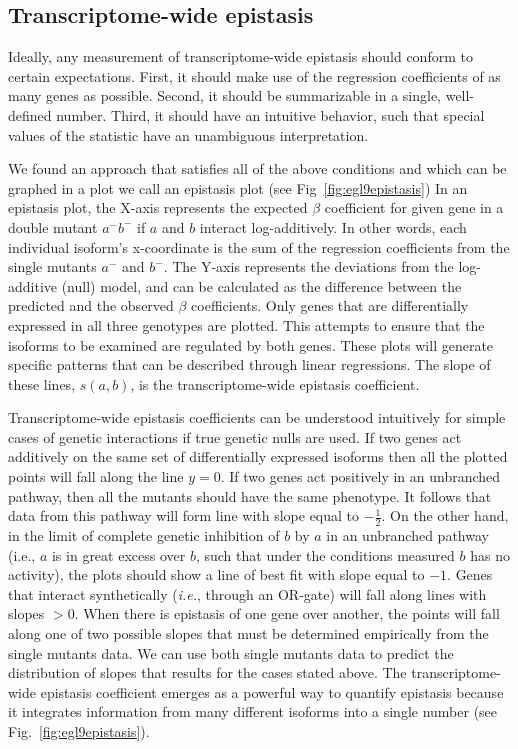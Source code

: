 \documentclass[9pt,twocolumn,twoside]{pnas-new}
\begin{document}
\subsection*{Transcriptome-wide epistasis}
Ideally, any measurement of transcriptome-wide epistasis should conform to
certain expectations. First, it should make use of the regression coefficients
of as many genes as possible. Second, it should be summarizable in a single,
well-defined number. Third, it should have an intuitive behavior, such that
special values of the statistic have an unambiguous interpretation.

We found an approach that satisfies all of the above conditions and which can
be graphed in a plot we call an epistasis plot (see Fig~\ref{fig:egl9epistasis})
In an epistasis plot, the X-axis represents the expected $\beta$ coefficient for
given gene in a double
mutant $a^-b^-$ if $a$ and $b$ interact log-additively. In other words, each
individual isoform's x-coordinate is the sum of the regression coefficients from
the single mutants $a^-$ and $b^-$. The Y-axis represents the deviations from
the log-additive (null) model, and can be calculated as the difference between
the predicted and the observed $\beta$ coefficients.
Only genes that are differentially expressed in all three genotypes are plotted.
This attempts to ensure that the isoforms to be examined are regulated by both genes.
These plots will generate specific patterns that can be described through linear
regressions. The slope of these lines, $s({a,b})$, is the transcriptome-wide
epistasis coefficient.

Transcriptome-wide epistasis coefficients can be understood intuitively for
simple cases of genetic interactions if true genetic nulls are used. If two
genes act additively on the same set of differentially expressed isoforms then
all the plotted points will fall along the line $y=0$. If two genes act
positively in an unbranched pathway, then all the mutants should have the same
phenotype. It follows that data from this pathway will form line with slope
equal to $-\frac{1}{2}$. On the other hand, in the limit of complete genetic
inhibition of $b$ by $a$ in an unbranched pathway (i.e., $a$ is in great excess
over $b$, such that under the conditions measured $b$ has no activity), the
plots should show a line of best fit with slope equal to $-1$. Genes that
interact synthetically (\emph{i.e.}, through an OR-gate) will fall along lines
with slopes $>0$. When there is epistasis of one gene over another, the points
will fall along one of two possible slopes that must be determined empirically
from the single mutants data. We can use both single mutants data to predict the
distribution of slopes that results for the cases stated above. The
transcriptome-wide epistasis coefficient emerges as a powerful way to quantify
epistasis because it integrates information from many different isoforms into a
single number (see Fig.~\ref{fig:egl9epistasis}).
\end{document}
